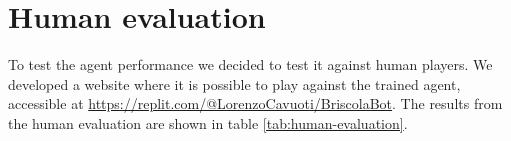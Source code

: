 \section{Human evaluation}
To test the agent performance we decided to test it against human players. We developed a website where it is possible to play against the trained agent, accessible at \url{https://replit.com/@LorenzoCavuoti/BriscolaBot}. The results from the human evaluation are shown in table \ref{tab:human-evaluation}.